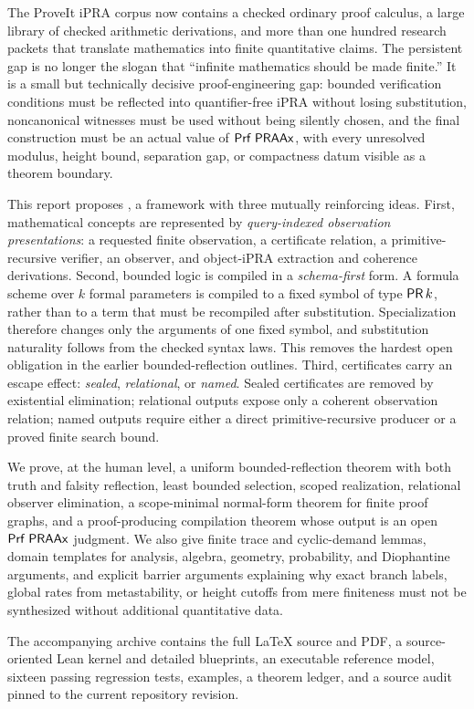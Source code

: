 The ProveIt iPRA corpus now contains a checked ordinary proof calculus, a large
library of checked arithmetic derivations, and more than one hundred research
packets that translate mathematics into finite quantitative claims.  The
persistent gap is no longer the slogan that ``infinite mathematics should be
made finite.''  It is a small but technically decisive proof-engineering gap:
bounded verification conditions must be reflected into quantifier-free iPRA
without losing substitution, noncanonical witnesses must be used without being
silently chosen, and the final construction must be an actual value of
\(\mathsf{Prf}\;\mathsf{PRAAx}\), with every unresolved modulus, height bound, separation gap,
or compactness datum visible as a theorem boundary.

This report proposes \Scope, a framework with three mutually reinforcing
ideas.  First, mathematical concepts are represented by \emph{query-indexed
observation presentations}: a requested finite observation, a certificate
relation, a primitive-recursive verifier, an observer, and object-iPRA
extraction and coherence derivations.  Second, bounded logic is compiled in a
\emph{schema-first} form.  A formula scheme over \(k\) formal parameters is
compiled to a fixed symbol of type \(\mathsf{PR}\,k\), rather than to a term that must
be recompiled after substitution.  Specialization therefore changes only the
arguments of one fixed symbol, and substitution naturality follows from the
checked syntax laws.  This removes the hardest open obligation in the earlier
bounded-reflection outlines.  Third, certificates carry an escape effect:
\emph{sealed}, \emph{relational}, or \emph{named}.  Sealed certificates are
removed by existential elimination; relational outputs expose only a coherent
observation relation; named outputs require either a direct primitive-recursive
producer or a proved finite search bound.

We prove, at the human level, a uniform bounded-reflection theorem with both
truth and falsity reflection, least bounded selection, scoped realization,
relational observer elimination, a scope-minimal normal-form theorem for finite
proof graphs, and a proof-producing compilation theorem whose output is an
open \(\mathsf{Prf}\;\mathsf{PRAAx}\) judgment.  We also give finite trace and cyclic-demand
lemmas, domain templates for analysis, algebra, geometry, probability, and
Diophantine arguments, and explicit barrier arguments explaining why exact
branch labels, global rates from metastability, or height cutoffs from mere
finiteness must not be synthesized without additional quantitative data.

The accompanying archive contains the full \LaTeX{} source and PDF, a
source-oriented Lean kernel and detailed blueprints, an executable reference
model, sixteen passing regression tests, examples, a theorem ledger, and a
source audit pinned to the current repository revision.
